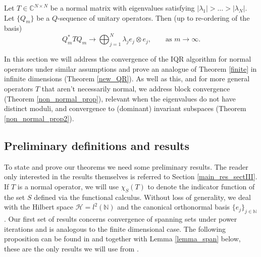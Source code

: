 \documentclass[a4paper,10pt]{article}
\begin{document}
\begin{theorem}\label{finite}
Let $T \in \mathbb{C}^{N \times N}$ 
be a normal matrix with eigenvalues satisfying $|\lambda_1| >
\hdots > 
|\lambda_N|$. 
Let $\{Q_m\}$ be a $Q$-sequence of
unitary operators. Then (up to re-ordering of the basis)
$$
Q^*_m T Q_m \longrightarrow \bigoplus_{j=1}^N \lambda_j e_j \otimes e_j, \qquad \text{as }m \rightarrow \infty.
$$ 
\end{theorem}

In this section we will address the convergence of the IQR algorithm for normal operators under similar assumptions and prove an analogue of Theorem \ref{finite} in infinite dimensions (Theorem \ref{new_QR}). As well as this, and for more general operators $T$ that aren't necessarily normal, we address block convergence (Theorem \ref{non_normal_prop}), relevant when the eigenvalues do not have distinct moduli, and convergence to (dominant) invariant subspaces (Theorem \ref{non_normal_prop2}).

\subsection{Preliminary definitions and results}
\label{prelims}

To state and prove our theorems we need some preliminary results. The reader only interested in the results themselves is referred to Section \ref{main_res_sectIII}. If $T$ is a normal operator, we will use $\chi_S(T)$ to denote the indicator function of the set $S$ defined via the functional calculus. Without loss of generality, we deal with the Hilbert space $\mathcal{H}=l^2(\mathbb{N})$ and the canonical orthonormal basis $\{e_j\}_{j\in\mathbb{N}}$. Our first set of results concerns convergence of spanning sets under power iterations and is analogous to the finite dimensional case. The following proposition can be found in \cite{hansen2008} and together with Lemma \ref{lemma_span} below, these are the only results we will use from \cite{hansen2008}.
 
\end{document}
